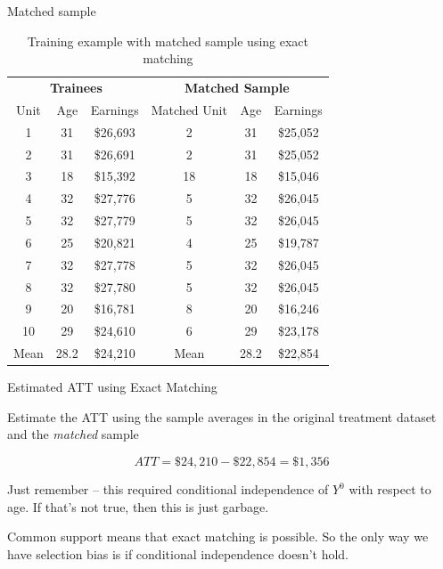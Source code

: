 \documentclass{beamer}
\begin{document}
\begin{frame}{Matched sample}

\begin{table}[htb]\small{}
\caption{Training example with matched sample using exact matching}
\centering
\begin{tabular}{ccc|ccc}
\toprule
	\multicolumn{3}{c}{\textbf{Trainees}}&
	\multicolumn{3}{c}{\textbf{Matched Sample}}\\
	\multicolumn{1}{c}{Unit}&
	\multicolumn{1}{c}{Age}&
	\multicolumn{1}{c}{Earnings}&
	\multicolumn{1}{c}{Matched Unit}&
	\multicolumn{1}{c}{Age}&
	\multicolumn{1}{c}{Earnings}\\
\midrule
1&	31&	\$26,693&	2&	31&	\$25,052 \\
2&	31&	\$26,691&	2&	31&	\$25,052 \\
3&	18&	\$15,392&	18&	18&	\$15,046 \\
4&	32&	\$27,776&	5&	32&	\$26,045 \\
5&	32&	\$27,779&	5&	32&	\$26,045 \\
6&	25&	\$20,821&	4&	25&	\$19,787 \\
7&	32&	\$27,778&	5&	32&	\$26,045 \\
8&	32&	\$27,780&	5&	32&	\$26,045 \\
9&	20&	\$16,781&	8&	20&	\$16,246 \\
10&	29&	\$24,610&	6&	29&	\$23,178 \\
\midrule
Mean&	28.2&	\$24,210&	Mean&	28.2&	\$22,854 \\
\bottomrule
\end{tabular}
\label{tab:trainee2}
\end{table}

\end{frame}

\begin{frame}{Estimated ATT using Exact Matching}

Estimate the ATT using the sample averages in the original treatment dataset and the \emph{matched} sample

\begin{equation}
ATT = \$24,210 - \$22,854 = \$1,356
\end{equation}

\bigskip

Just remember -- this required conditional independence of $Y^0$ with respect to age. If that's not true, then this is just garbage.

\bigskip

Common support means that exact matching is possible.  So the only way we have selection bias is if conditional independence doesn't hold.

\end{frame}
\end{document}
